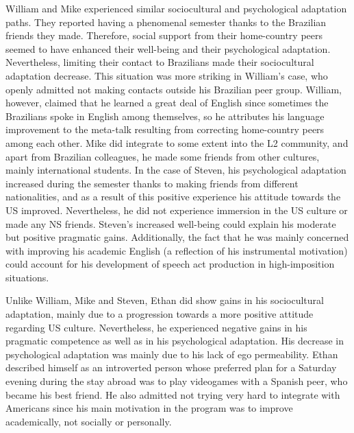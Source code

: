 \documentclass[12pt]{article}
\newenvironment{styleStandard}{\setlength\leftskip{0cm}\setlength\rightskip{0cm plus 1fil}\setlength\parindent{0cm}\setlength\parfillskip{0pt plus 1fil}\setlength\parskip{0in plus 1pt}\writerlistparindent\writerlistleftskip\leavevmode\normalfont\normalsize\writerlistlabel\ignorespaces}{\unskip\vspace{0.111in plus 0.0111in}\par}
\newcommand\writerlistleftskip{}
\newcommand\writerlistparindent{}
\newcommand\writerlistlabel{}
\begin{document}
\begin{styleStandard}
William and Mike experienced similar sociocultural and psychological adaptation paths. They reported having a phenomenal semester thanks to the Brazilian friends they made. Therefore, social support from their home-country peers seemed to have enhanced their well-being and their psychological adaptation. Nevertheless, limiting their contact to Brazilians made their sociocultural adaptation decrease. This situation was more striking in William’s case, who openly admitted not making contacts outside his Brazilian peer group. William, however, claimed that he learned a great deal of English since sometimes the Brazilians spoke in English among themselves, so he attributes his language improvement to the meta-talk resulting from correcting home-country peers among each other. Mike did integrate to some extent into the L2 community, and apart from Brazilian colleagues, he made some friends from other cultures, mainly international students. In the case of Steven, his psychological adaptation increased during the semester thanks to making friends from different nationalities, and as a result of this positive experience his attitude towards the US improved. Nevertheless, he did not experience immersion in the US culture or made any NS friends. Steven’s increased well-being could explain his moderate but positive pragmatic gains. Additionally, the fact that he was mainly concerned with improving his academic English (a reflection of his instrumental motivation) could account for his development of speech act production in high-imposition situations. 
\end{styleStandard}

\begin{styleStandard}
Unlike William, Mike and Steven, Ethan did show gains in his sociocultural adaptation, mainly due to a progression towards a more positive attitude regarding US culture. Nevertheless, he experienced negative gains in his pragmatic competence as well as in his psychological adaptation. His decrease in psychological adaptation was mainly due to his lack of ego permeability. Ethan described himself as an introverted person whose preferred plan for a Saturday evening during the stay abroad was to play videogames with a Spanish peer, who became his best friend. He also admitted not trying very hard to integrate with Americans since his main motivation in the program was to improve academically, not socially or personally.
\end{styleStandard}
\end{document}
